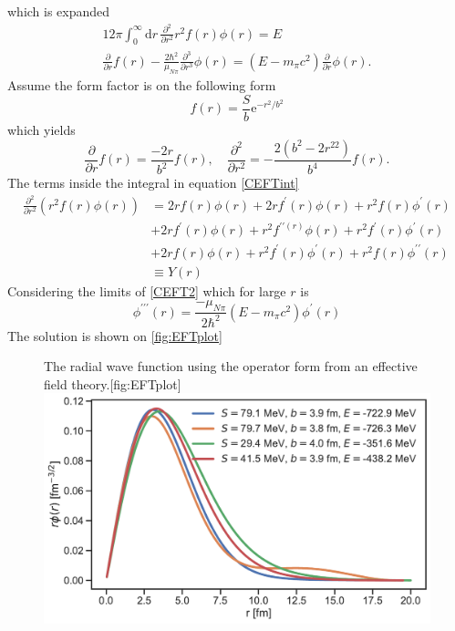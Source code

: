 which is expanded
\begin{align}\label{CEFTint}
	12\pi \int_0^\infty \text{d}r \, \frac{\partial^2}{\partial r^2}r^2f(r)\phi(r) =E \\
	\frac{\partial}{\partial r}f(r)-\frac{2\hbar^2}{\mu_{N\pi}} \frac{\partial^3}{\partial r^3}\phi(r) = (E-m_\pi c^2)\frac{\partial}{\partial r}\phi(r)\label{CEFT2}.
\end{align}
Assume the form factor is on the following form
\begin{equation}
	f(r) = \frac{S}{b}\text{e}^{-r^2/b^2}
\end{equation}
which yields
\begin{equation}
	\frac{\partial}{\partial r} f(r) = \frac{-2r}{b^2}f(r), \quad \frac{\partial^2}{\partial r^2}=-\frac{2(b^2-2r^22)}{b^4}f(r).
\end{equation}
The terms inside the integral in equation \eqref{CEFTint} 
\begin{align}
	\frac{\partial^2}{\partial r^2}(r^2f(r)\phi(r)) & = 2rf(r)\phi(r)+2rf^\prime(r)\phi(r)+r^2f(r)\phi ^\prime(r)
	\\&+2rf^\prime(r)\phi(r)+r^2f^{\prime\prime(r)}\phi(r)+r^2f^\prime(r)\phi^\prime(r)\\
	&+2rf(r)\phi(r)+r^2f^\prime(r)\phi^\prime (r)+r^2f(r)\phi^{\prime\prime}(r) \\&\equiv Y(r) \label{manyterms}
\end{align}
Considering the limits of \eqref{CEFT2} which for large $r$ is
\begin{equation}
	\phi^{\prime\prime\prime}(r) =\frac{-\mu_{N\pi}}{2\hbar^2}(E-m_\pi c^2)\phi^\prime(r)
\end{equation}
The solution is shown on \ref{fig:EFTplot}
\begin{figure}[H]
	\begin{sidecaption}{The radial wave function using the operator form from an effective field theory.}[fig:EFTplot]
		\includegraphics[width=\linewidth]{Figures/EFTradial.pdf}
	\end{sidecaption}
\end{figure}
